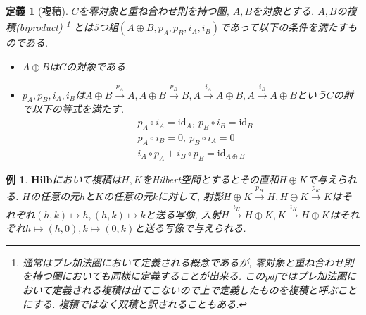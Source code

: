 \documentclass[a4paper,12pt]{ltjsarticle}
\theoremstyle{break}
\newtheorem{defn}[thm]{定義}
\newtheorem{eg}[thm]{例}
\newcommand{\hilb}{\mathbf{Hilb}}
\newcommand{\xr}[1]{\xrightarrow{#1}}
\newcommand{\id}{\mathrm{id}}
\newcommand{\ci}{\circ}
\newcommand{\opl}{\oplus}
\numberwithin{equation}{section}
\begin{document}
\begin{defn}[複積]
  $C$を零対象と重ね合わせ則を持つ圏, $A,B$を対象とする. 
  $A,B$の複積(biproduct)
  \footnote{
    通常はプレ加法圏において定義される概念であるが, 零対象と重ね合わせ則を持つ圏においても同様に定義することが出来る.
    このpdfではプレ加法圏において定義される複積は出てこないので上で定義したものを複積と呼ぶことにする.  
    複積ではなく双積と訳されることもある. 
  }
  とは5つ組$(A \opl B, p_A,p_B,i_A,i_B)$であって以下の条件を満たすものである. 
  \begin{itemize}
    \item $A \opl B$は$C$の対象である. 
    \item $p_A,p_B,i_A,i_B$は$A \opl B \xr{p_A} A, A \opl B \xr{p_B} B, A \xr{i_A} A \opl B, A \xr{i_B} A \opl B$という$C$の射で以下の等式を満たす. 
    \begin{align*}
      &p_A \ci i_A = \id_A, ~ p_B \ci i_B = \id_B \\
      &p_A \ci i_B = 0, ~ p_B \ci i_A = 0 \\
      &i_A \ci p_A + i_B \ci p_B = \id_{A \opl B} 
    \end{align*}
  \end{itemize}
\end{defn}

\begin{eg}
  $\hilb$において複積は$H,K$をHilbert空間とするとその直和$H \opl K$で与えられる. 
  $H$の任意の元$h$と$K$の任意の元$k$に対して, 射影$H \opl K \xr{p_H} H, H \opl K \xr{p_K} K$はそれぞれ$(h,k) \mapsto h, (h,k) \mapsto k$と送る写像, 入射$H \xr{i_H} H \opl K, K \xr{i_K} H \opl K$はそれぞれ$h \mapsto (h,0), k \mapsto (0,k)$と送る写像で与えられる. 
\end{eg}
\end{document}
